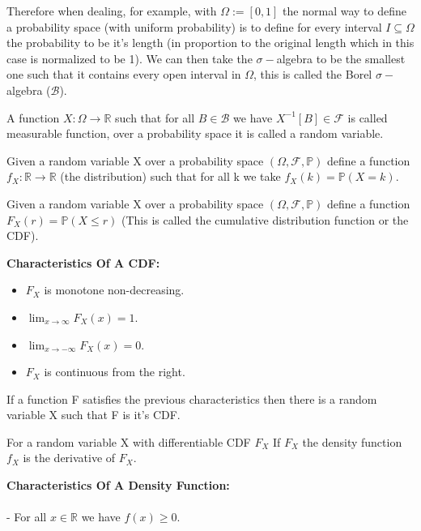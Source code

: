 \documentclass[../main.tex]{subfiles}
\begin{document}
Therefore when dealing, for example, with $\Omega:=[0,1]$ the normal way to define a probability space (with uniform probability) is to define for every interval $I\subseteq\Omega$ the probability to be it's length (in proportion to the original length which in this case is normalized to be 1). We can then take the $\sigma-$algebra to be the smallest one such that it contains every open interval in $\Omega$, this is called the Borel $\sigma-$algebra ($\mathcal{B}$).
\begin{definition} A function $X:\Omega\rightarrow\mathbb{R}$ such that for all $B\in\mathcal{B}$ we have $X^{-1}[B]\in\mathcal{F}$ is called measurable function, over a probability space it is called a random variable. \end{definition}
\begin{definition} Given a random variable X over a probability space $(\Omega,\mathcal{F},\mathbb{P})$ define a function $f_X:\mathbb{R}\rightarrow\mathbb{R}$ (the distribution) such that for all k we take $f_X(k) = \mathbb{P}(X=k)$. \end{definition}
\begin{definition} Given a random variable X over a probability space $(\Omega,\mathcal{F},\mathbb{P})$ define a function $F_X(r) = \mathbb{P}(X\leq r)$ (This is called the cumulative distribution function or the CDF). \end{definition}
\textbf{Characteristics Of A CDF:} 
\begin{itemize}
\item $F_X$ is monotone non-decreasing. 
\item $\lim_{x\rightarrow\infty} F_X(x) = 1.$ 
\item $\lim_{x\rightarrow-\infty} F_X(x) = 0.$
\item $F_X$ is continuous from the right. 
\end{itemize}
\begin{theorem}
If a function F satisfies the previous characteristics then there is a random variable X such that F is it's CDF. \end{theorem}
\begin{definition} For a random variable X with differentiable CDF $F_X$ If $F_X$ the density function $f_X$ is the derivative of $F_X$. \end{definition}
\textbf{Characteristics Of A Density Function:}\\\\
- For all $x\in\mathbb{R}$ we have $f(x)\geq 0$. \\\\
\end{document}
